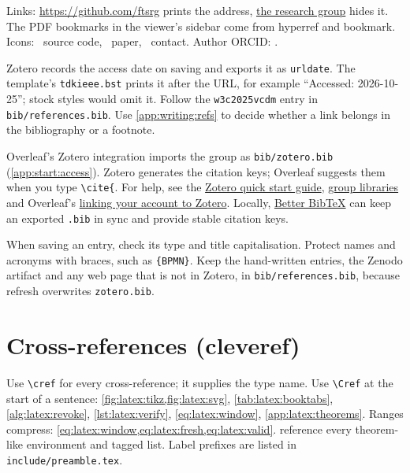 Links: \url{https://github.com/ftsrg} prints the address, \href{https://ftsrg.mit.bme.hu}{the research group} hides it.
The PDF bookmarks in the viewer's sidebar come from hyperref and bookmark.
Icons: \faGithub~source code, \faFilePdf~paper, \faEnvelope~contact. Author ORCID: .

Zotero records the access date on saving and exports it as \texttt{urldate}. The template's \texttt{tdkieee.bst} prints it after the URL, for example \enquote{Accessed: 2026-10-25}; stock styles would omit it. Follow the \texttt{w3c2025vcdm} entry in \texttt{bib/references.bib}. Use \cref{app:writing:refs} to decide whether a link belongs in the bibliography or a footnote.

Overleaf's Zotero integration imports the group as \texttt{bib/zotero.bib} (\cref{app:start:access}). Zotero generates the citation keys; Overleaf suggests them when you type \texttt{\textbackslash cite\{}. For help, see the \href{https://www.zotero.org/support/quick_start_guide}{Zotero quick start guide}, \href{https://www.zotero.org/support/groups}{group libraries} and Overleaf's \href{https://www.overleaf.com/learn/how-to/How_to_link_your_Overleaf_account_to_Mendeley_and_Zotero}{linking your account to Zotero}. Locally, \href{https://retorque.re/zotero-better-bibtex/}{Better BibTeX} can keep an exported \texttt{.bib} in sync and provide stable citation keys.

When saving an entry, check its type and title capitalisation. Protect names and acronyms with braces, such as \texttt{\{BPMN\}}. Keep the hand-written entries, the Zenodo artifact and any web page that is not in Zotero, in \texttt{bib/references.bib}, because refresh overwrites \texttt{zotero.bib}.

\section{Cross-references (cleveref)}\label{app:latex:cref}
Use \texttt{\textbackslash cref} for every cross-reference; it supplies the type name. Use \texttt{\textbackslash Cref} at the start of a sentence:
\cref{fig:latex:tikz,fig:latex:svg}, \cref{tab:latex:booktabs}, \cref{alg:latex:revoke}, \cref{lst:latex:verify}, \cref{eq:latex:window}, \cref{app:latex:theorems}.
Ranges compress: \cref{eq:latex:window,eq:latex:fresh,eq:latex:valid}.
 reference every theorem-like environment and tagged list.
Label prefixes are listed in \texttt{include/preamble.tex}.

